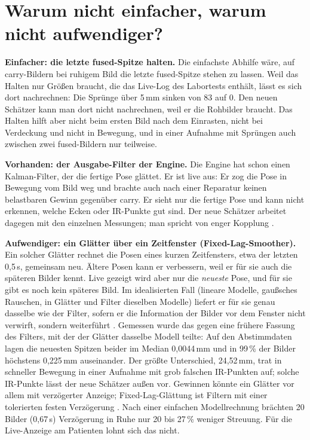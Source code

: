 \documentclass[11pt,a4paper,fleqn]{article}
\begin{document}
\section{Warum nicht einfacher, warum nicht aufwendiger?}
\label{sec:smoother}

\textbf{Einfacher: die letzte fused-Spitze halten.} Die einfachste Abhilfe wäre, auf carry-Bildern bei ruhigem
Bild die letzte fused-Spitze stehen zu lassen. Weil das Halten nur Größen braucht, die das Live-Log des Labortests
enthält, lässt es sich dort nachrechnen: Die Sprünge über 5\,mm sinken von 83 auf 0. Den neuen Schätzer kann man
dort nicht nachrechnen, weil er die Rohbilder braucht. Das Halten hilft aber nicht beim ersten Bild nach dem
Einrasten, nicht bei Verdeckung und nicht in Bewegung, und in einer Aufnahme mit Sprüngen auch zwischen zwei
fused-Bildern nur teilweise.

\textbf{Vorhanden: der Ausgabe-Filter der Engine.} Die Engine hat schon einen Kalman-Filter, der die fertige Pose
glättet. Er ist live aus: Er zog die Pose in Bewegung vom Bild weg und brachte auch nach einer Reparatur keinen
belastbaren Gewinn gegenüber carry. Er sieht nur die fertige Pose und kann
nicht erkennen, welche Ecken oder IR-Punkte gut sind. Der neue Schätzer arbeitet dagegen mit den einzelnen
Messungen; man spricht von enger Kopplung \cite[S.~493]{tobergte2009robust}.

\textbf{Aufwendiger: ein Glätter über ein Zeitfenster (Fixed-Lag-Smoother).} Ein solcher Glätter rechnet die Posen
eines kurzen Zeitfensters, etwa der letzten 0,5\,s, gemeinsam neu. Ältere Posen kann er verbessern, weil er für sie
auch die späteren Bilder kennt. Live gezeigt wird aber nur die \emph{neueste} Pose, und für sie gibt es noch kein
späteres Bild. Im idealisierten Fall (lineare Modelle, gaußsches Rauschen, in Glätter und Filter dieselben Modelle)
liefert er für sie genau dasselbe wie der Filter, sofern er die Information der Bilder vor dem Fenster nicht
verwirft, sondern weiterführt \cite[Thm.~8.2]{saerkkae2013bayesian}. Gemessen wurde das gegen eine frühere Fassung
des Filters, mit der der Glätter dasselbe Modell teilte: Auf den Abstimmdaten lagen die neuesten Spitzen beider im
Median 0,0044\,mm und in 99\,\% der Bilder höchstens 0,225\,mm auseinander. Der größte Unterschied, 24,52\,mm, trat
in schneller Bewegung in einer Aufnahme mit grob falschen IR-Punkten auf; solche IR-Punkte lässt der neue Schätzer
außen vor. Gewinnen könnte ein Glätter vor allem mit verzögerter Anzeige;
Fixed-Lag-Glättung ist Filtern mit einer tolerierten festen Verzögerung \cite[S.~160]{saerkkae2013bayesian}. Nach
einer einfachen Modellrechnung brächten 20 Bilder (0,67\,s) Verzögerung in Ruhe nur 20 bis 27\,\% weniger
Streuung. Für die Live-Anzeige am Patienten lohnt sich das nicht.
\end{document}
